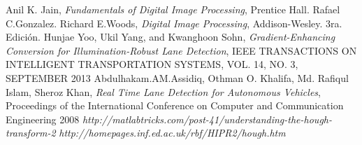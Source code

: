 \documentclass[a4paper,spanish]{article}
\begin{document}
\begin{thebibliography}{}
                        Anil K. Jain,
                        \textit{Fundamentals of Digital Image Processing},
                        Prentice Hall. 
                        Rafael C.Gonzalez. Richard E.Woods,
                        \textit{Digital Image Processing},
                        Addison-Wesley. 3ra. Edición. 
                       Hunjae Yoo, Ukil Yang, and Kwanghoon Sohn,
                        \textit{Gradient-Enhancing Conversion for Illumination-Robust Lane Detection},
                        IEEE TRANSACTIONS ON INTELLIGENT TRANSPORTATION SYSTEMS, VOL. 14, NO. 3, SEPTEMBER 2013 
                        Abdulhakam.AM.Assidiq, Othman O. Khalifa, Md. Rafiqul Islam, Sheroz Khan,
                        \textit{Real Time Lane Detection for Autonomous Vehicles},
                        Proceedings of the International Conference on Computer and Communication Engineering 2008 
                        \textit{http://matlabtricks.com/post-41/understanding-the-hough-transform-2}
                        \textit{http://homepages.inf.ed.ac.uk/rbf/HIPR2/hough.htm}
\end{thebibliography}
\end{document}
